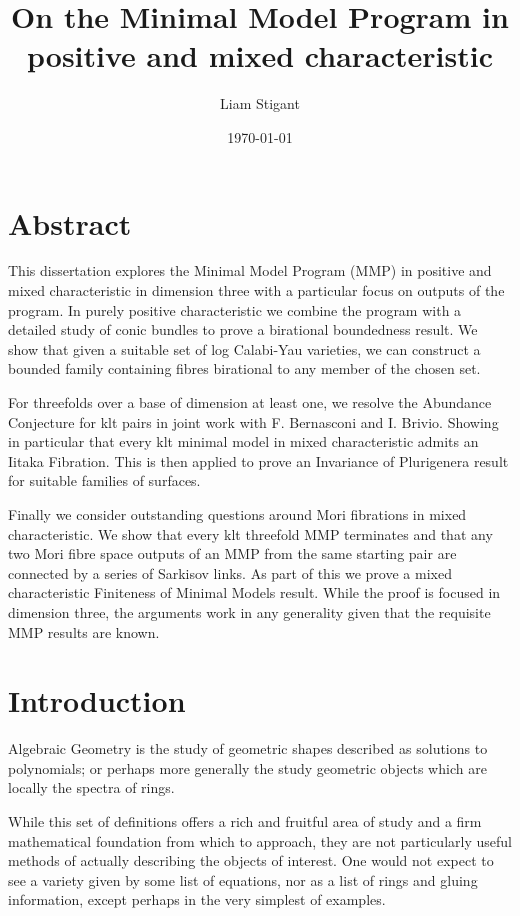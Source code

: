 \documentclass[a4paper,12pt]{book}
\begin{document}
	\title{On the Minimal Model Program in positive and mixed characteristic}
	\author{Liam Stigant}
	\date{\today}
	\maketitle
	\chapter*{Abstract}
		
		This dissertation explores the Minimal Model Program (MMP) in positive and mixed characteristic in dimension three with a particular focus on outputs of the program. In purely positive characteristic we combine the program with a detailed study of conic bundles to prove a birational boundedness result. We show that given a suitable set of log Calabi-Yau varieties, we can construct a bounded family containing fibres birational to any member of the chosen set.
		
		For threefolds over a base of dimension at least one, we resolve the Abundance Conjecture for klt pairs in joint work with F. Bernasconi and I. Brivio. Showing in particular that every klt minimal model in mixed characteristic admits an Iitaka Fibration. This is then applied to prove an Invariance of Plurigenera result for suitable families of surfaces.
		
		Finally we consider outstanding questions around Mori fibrations in mixed characteristic. We show that every klt threefold MMP terminates and that any two Mori fibre space outputs of an MMP from the same starting pair are connected by a series of Sarkisov links. As part of this we prove a mixed characteristic Finiteness of Minimal Models result. While the proof is focused in dimension three, the arguments work in any generality given that the requisite MMP results are known.
		
	\tableofcontents
	
	\chapter{Introduction}
	
	Algebraic Geometry is the study of geometric shapes described as solutions to polynomials; or perhaps more generally the study geometric objects which are locally the spectra of rings.
	
	While this set of definitions offers a rich and fruitful area of study and a firm mathematical foundation from which to approach, they are not particularly useful methods of actually describing the objects of interest. One would not expect to see a variety given by some list of equations, nor as a list of rings and gluing information, except perhaps in the very simplest of examples.
	
\end{document}
